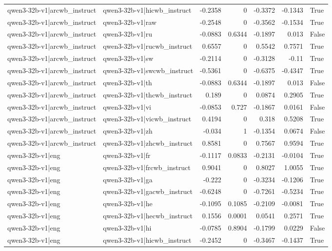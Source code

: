 \begin{table}
\begin{tabular}{l l r r r r l}
qwen3-32b-v1|arcwb_instruct & qwen3-32b-v1|hicwb_instruct & -0.2358 & 0 & -0.3372 & -0.1343 & True \\
qwen3-32b-v1|arcwb_instruct & qwen3-32b-v1|raw & -0.2548 & 0 & -0.3562 & -0.1534 & True \\
qwen3-32b-v1|arcwb_instruct & qwen3-32b-v1|ru & -0.0883 & 0.6344 & -0.1897 & 0.013 & False \\
qwen3-32b-v1|arcwb_instruct & qwen3-32b-v1|rucwb_instruct & 0.6557 & 0 & 0.5542 & 0.7571 & True \\
qwen3-32b-v1|arcwb_instruct & qwen3-32b-v1|sw & -0.2114 & 0 & -0.3128 & -0.11 & True \\
qwen3-32b-v1|arcwb_instruct & qwen3-32b-v1|swcwb_instruct & -0.5361 & 0 & -0.6375 & -0.4347 & True \\
qwen3-32b-v1|arcwb_instruct & qwen3-32b-v1|th & -0.0883 & 0.6344 & -0.1897 & 0.013 & False \\
qwen3-32b-v1|arcwb_instruct & qwen3-32b-v1|thcwb_instruct & 0.189 & 0 & 0.0874 & 0.2905 & True \\
qwen3-32b-v1|arcwb_instruct & qwen3-32b-v1|vi & -0.0853 & 0.727 & -0.1867 & 0.0161 & False \\
qwen3-32b-v1|arcwb_instruct & qwen3-32b-v1|vicwb_instruct & 0.4194 & 0 & 0.318 & 0.5208 & True \\
qwen3-32b-v1|arcwb_instruct & qwen3-32b-v1|zh & -0.034 & 1 & -0.1354 & 0.0674 & False \\
qwen3-32b-v1|arcwb_instruct & qwen3-32b-v1|zhcwb_instruct & 0.8581 & 0 & 0.7567 & 0.9594 & True \\
qwen3-32b-v1|eng & qwen3-32b-v1|fr & -0.1117 & 0.0833 & -0.2131 & -0.0104 & True \\
qwen3-32b-v1|eng & qwen3-32b-v1|frcwb_instruct & 0.9041 & 0 & 0.8027 & 1.0055 & True \\
qwen3-32b-v1|eng & qwen3-32b-v1|ga & -0.222 & 0 & -0.3234 & -0.1206 & True \\
qwen3-32b-v1|eng & qwen3-32b-v1|gacwb_instruct & -0.6248 & 0 & -0.7261 & -0.5234 & True \\
qwen3-32b-v1|eng & qwen3-32b-v1|he & -0.1095 & 0.1085 & -0.2109 & -0.0081 & True \\
qwen3-32b-v1|eng & qwen3-32b-v1|hecwb_instruct & 0.1556 & 0.0001 & 0.0541 & 0.2571 & True \\
qwen3-32b-v1|eng & qwen3-32b-v1|hi & -0.0785 & 0.8904 & -0.1799 & 0.0229 & False \\
qwen3-32b-v1|eng & qwen3-32b-v1|hicwb_instruct & -0.2452 & 0 & -0.3467 & -0.1437 & True \\

\end{tabular}
\end{table}
